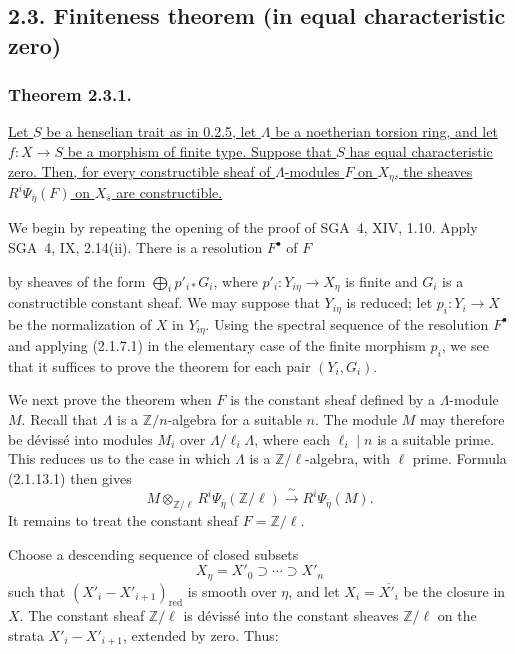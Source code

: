 \subsection*{2.3. Finiteness theorem (in equal characteristic zero)}

\subsubsection*{Theorem 2.3.1.}
\underline{Let $S$ be a henselian trait as in 0.2.5, let $\Lambda$ be
a noetherian torsion ring, and let $f:X\longrightarrow S$ be a
morphism of finite type.  Suppose that $S$ has equal characteristic
zero.  Then, for every constructible sheaf of $\Lambda$-modules $F$
on $X_\eta$, the sheaves $R^i\Psi_{\bar\eta}(F)$ on $X_{\bar s}$ are
constructible.}

We begin by repeating the opening of the proof of SGA~4, XIV, 1.10.
Apply SGA~4, IX, 2.14(ii).  There is a resolution $F^\bullet$ of $F$
\begin{center}
\end{center}
by sheaves of the form $\bigoplus_i p'_{i*}G_i$, where
$p'_i:Y_{i\eta}\longrightarrow X_\eta$ is finite and $G_i$ is a
constructible constant sheaf.  We may suppose that $Y_{i\eta}$ is
reduced; let $p_i:Y_i\longrightarrow X$ be the normalization of $X$
in $Y_{i\eta}$.  Using the spectral sequence of the resolution
$F^\bullet$ and applying (2.1.7.1) in the elementary case of the
finite morphism $p_i$, we see that it suffices to prove the theorem
for each pair $(Y_i,G_i)$.

We next prove the theorem when $F$ is the constant sheaf defined by a
$\Lambda$-module $M$.  Recall that $\Lambda$ is a
$\mathbb Z/n$-algebra for a suitable $n$.  The module $M$ may
therefore be d\'{e}viss\'{e} into modules $M_i$ over
$\Lambda/\ell_i\Lambda$, where each $\ell_i\mid n$ is a suitable
prime.  This reduces us to the case in which $\Lambda$ is a
$\mathbb Z/\ell$-algebra, with $\ell$ prime.  Formula (2.1.13.1) then
gives
\[
M\otimes_{\mathbb Z/\ell}
R^i\Psi_{\bar\eta}(\mathbb Z/\ell)
\xrightarrow{\ \sim\ }
R^i\Psi_{\bar\eta}(M).
\]
It remains to treat the constant sheaf $F=\mathbb Z/\ell$.

Choose a descending sequence of closed subsets
\[
X_\eta=X'_0\supset\cdots\supset X'_n
\]
such that $(X'_i-X'_{i+1})_{\mathrm{red}}$ is smooth over $\eta$, and
let $X_i=\overline{X'_i}$ be the closure in $X$.  The constant sheaf
$\mathbb Z/\ell$ is d\'{e}viss\'{e} into the constant sheaves
$\mathbb Z/\ell$ on the strata $X'_i-X'_{i+1}$, extended by zero.
Thus:

